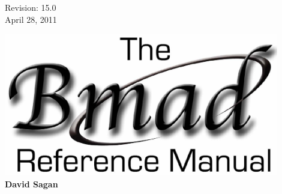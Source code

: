 \thispagestyle{empty}

\begin{flushright}
\large
  Revision: 15.0 \\
  April 28, 2011 \\
\end{flushright}

\vfill

{
\begin{center}
\includegraphics[width=12cm]{bmad-ref-manual.pdf} \\
\vskip 0.3in
\huge\bf David Sagan
\end{center}
}

\vfill
\break

